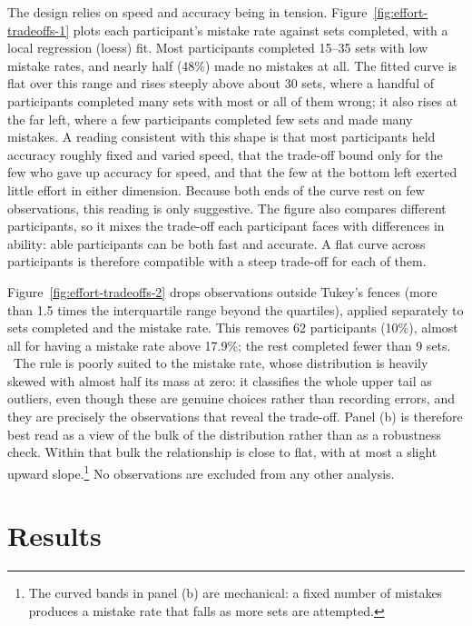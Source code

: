 \documentclass[12pt, letterpaper]{article}
\begin{document}
The design relies on speed and accuracy being in tension. Figure~\ref{fig:effort-tradeoffs-1} plots each participant's mistake rate against sets completed, with a local regression (loess) fit. Most participants completed 15--35 sets with low mistake rates, and nearly half (48\%) made no mistakes at all. The fitted curve is flat over this range and rises steeply above about 30 sets, where a handful of participants completed many sets with most or all of them wrong; it also rises at the far left, where a few participants completed few sets and made many mistakes. A reading consistent with this shape is that most participants held accuracy roughly fixed and varied speed, that the trade-off bound only for the few who gave up accuracy for speed, and that the few at the bottom left exerted little effort in either dimension. Because both ends of the curve rest on few observations, this reading is only suggestive. The figure also compares different participants, so it mixes the trade-off each participant faces with differences in ability: able participants can be both fast and accurate. A flat curve across participants is therefore compatible with a steep trade-off for each of them.

Figure~\ref{fig:effort-tradeoffs-2} drops observations outside Tukey's fences (more than 1.5 times the interquartile range beyond the quartiles), applied separately to sets completed and the mistake rate. This removes 62 participants (10\%), almost all for having a mistake rate above 17.9\%; the rest completed fewer than 9 sets.%
\ The rule is poorly suited to the mistake rate, whose distribution is heavily skewed with almost half its mass at zero: it classifies the whole upper tail as outliers, even though these are genuine choices rather than recording errors, and they are precisely the observations that reveal the trade-off. Panel (b) is therefore best read as a view of the bulk of the distribution rather than as a robustness check. Within that bulk the relationship is close to flat, with at most a slight upward slope.\footnote{The curved bands in panel (b) are mechanical: a fixed number of mistakes produces a mistake rate that falls as more sets are attempted.} No observations are excluded from any other analysis.

\section{Results}
\end{document}
